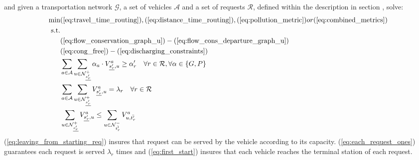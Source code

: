  and given a transportation network $\mathcal{G}$, a set of vehicles $\mathcal{A}$ and a set of requests $\mathcal{R}$, defined within the description in section , solve:\\
\begin{align}
	\text{min}&  
		(\ref{eq:travel_time_routing}), (\ref{eq:distance_time_routing}), (\ref{eq:pollution_metric}) or (\ref{eq:combined_metrics})
	\nonumber\\
	\text{s.t.} &\nonumber\\
	&(\ref{eq:flow_conservation_graph_u})-(\ref{eq:flow_cons_departure_graph_u})\nonumber\\
	&(\ref{eq:cong_free})-(\ref{eq:discharging_constraints})\nonumber\\
	&\sum_{ a \in \mathcal{A} }
	\sum_{u \in \mathcal{N}^+_{\underline{s'_r}} } \alpha_a \cdot V^a_{ \underline{s'_r}, u} \ge \alpha'_r \quad \forall r \in \mathcal{R}, \forall \alpha \in \{G, P\}	\label{eq:leaving_from_starting_req}\\
	&\sum_{ a \in \mathcal{A} }\sum_{u \in \mathcal{N}^+_{\underline{s'_r}} } V^a_{ \underline{s'_r}, u} =\lambda_r\quad \forall r \in \mathcal{R}	\label{eq:each_request_ones}\\
	&\sum_{u \in \mathcal{N}^+_{\underline{s'_r}} }  V^a_{ \underline{s'_r}, u} \leq \sum_{u \in \mathcal{N}^-_{\bar{t'_r}} }  V^a_{u,\bar{t'_r}} \label{eq:first_start}
\end{align}
(\ref{eq:leaving_from_starting_req}) insures that request can be served by the vehicle according to its capacity. (\ref{eq:each_request_ones}) guarantees each request is served $\lambda_r$ times and (\ref{eq:first_start}) insures that each vehicle reaches the terminal station of each request. 
\fi

